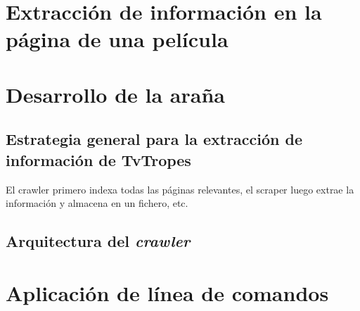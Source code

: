 \section{Extracción de información en la página de una película}

\section{Desarrollo de la araña}

\subsection{Estrategia general para la extracción de información de TvTropes}
El crawler primero indexa todas las páginas relevantes, el scraper luego extrae
la información y almacena en un fichero, etc.

\subsection{Arquitectura del \textit{crawler}}

\section{Aplicación de línea de comandos}
